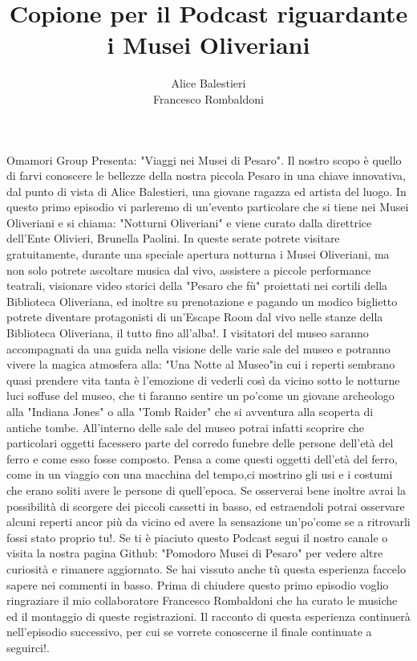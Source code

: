 \documentclass[hidelinks,12pt,a4paper]{article}
\begin{document}
	\begin{flushleft}
		
		\title{\textbf{Copione per il Podcast riguardante i Musei Oliveriani}}
		\author{Alice Balestieri\\Francesco Rombaldoni}
		\date{}
		
		\item Omamori Group Presenta: "Viaggi nei Musei di Pesaro".
		      Il nostro scopo è quello di farvi conoscere le bellezze della nostra piccola Pesaro in una chiave innovativa, dal punto di vista di Alice Balestieri, una giovane ragazza ed artista del luogo.
		      In questo primo episodio vi parleremo di un'evento particolare che si tiene nei Musei Oliveriani e si chiama: "Notturni Oliveriani" e viene curato dalla direttrice dell'Ente Olivieri, Brunella Paolini.
		      In queste serate potrete visitare gratuitamente, durante una speciale apertura notturna i Musei Oliveriani, ma non solo potrete ascoltare musica dal vivo, assistere a piccole performance teatrali, visionare video storici della "Pesaro che fù" proiettati nei cortili della Biblioteca Oliveriana, ed inoltre su prenotazione e pagando un modico biglietto potrete diventare protagonisti di un'Escape Room dal vivo nelle stanze della Biblioteca Oliveriana, il tutto fino all'alba!.
		      I visitatori del museo saranno accompagnati da una guida nella visione delle varie sale del museo e potranno vivere la magica atmosfera alla: "Una Notte al Museo"in cui i reperti sembrano quasi prendere vita tanta è l'emozione di vederli così da vicino sotto le notturne luci soffuse del museo, che ti faranno sentire un po'come un giovane archeologo alla "Indiana Jones" o alla "Tomb Raider" che si avventura alla scoperta di antiche tombe.
		      All'interno delle sale del museo potrai infatti scoprire che particolari oggetti facessero parte del corredo funebre delle persone dell'età del ferro e come esso fosse composto.
		      Pensa a come questi oggetti dell'età del ferro, come in un viaggio con una macchina del tempo,ci mostrino gli usi e i costumi che erano soliti avere le persone di quell'epoca.
		      Se osserverai bene inoltre avrai la possibilità di scorgere dei piccoli cassetti in basso, ed estraendoli potrai osservare alcuni  reperti ancor più da vicino ed avere la sensazione un'po'come se a ritrovarli fossi stato proprio tu!.
		      Se ti è piaciuto questo Podcast segui il nostro canale o visita la nostra pagina Github: "Pomodoro Musei di Pesaro" per vedere altre curiosità e rimanere aggiornato.
		      Se hai vissuto anche tù questa esperienza faccelo sapere nei commenti in basso.
		      Prima di chiudere questo primo episodio voglio ringraziare il mio collaboratore Francesco Rombaldoni che ha curato le musiche ed il montaggio di queste registrazioni.
		      Il racconto di questa esperienza continuerà nell'episodio successivo, per cui se vorrete conoscerne il finale continuate a seguirci!.
		      

\end{flushleft}
\end{document}
